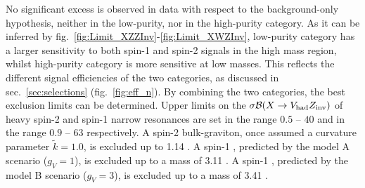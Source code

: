 \noindent No significant excess is observed in data with respect to the background-only hypothesis, neither in the low-purity, nor in the high-purity category. As it can be inferred by fig.~\ref{fig:Limit_XZZInv}-\ref{fig:Limit_XWZInv}, low-purity category has a larger sensitivity to both spin-1 and spin-2 signals in the high mass region, whilst high-purity category is more sensitive at low masses. This reflects the different signal efficiencies of the two categories, as discussed in sec.~\ref{sec:selections} (fig.~\ref{fig:eff_n}). By combining the two categories, the best exclusion limits can be determined. Upper limits on the $\sigma \mathcal{B} (X \rightarrow V_{\text{had}} Z_{\text{inv}})$ of heavy spin-2 and spin-1 narrow resonances are set in the range $0.5$ -- $40$ \fb and in the range $0.9$ -- $63$ \fb respectively. A spin-2 bulk-graviton, once assumed a curvature parameter $\tilde{k} = 1.0$, is excluded up to 1.14 \TeV. A spin-1 \Wp, predicted by the model A scenario ($g_V=1$), is excluded up to a mass of 3.11 \TeV. A spin-1 \Wp, predicted by the model B scenario ($g_V=3$), is excluded up to a mass of 3.41 \TeV. 


